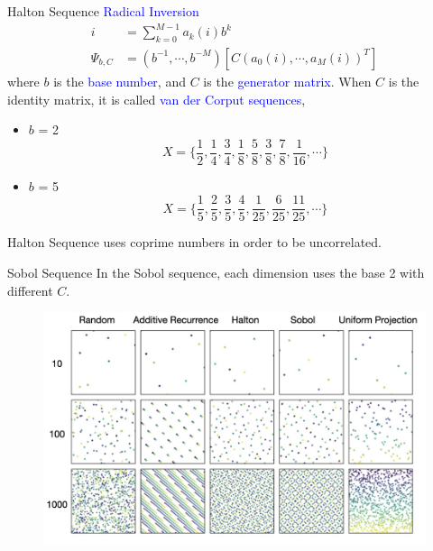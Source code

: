 \documentclass{beamer}
\begin{document}
\begin{frame}{Halton Sequence}
\textcolor{blue}{Radical Inversion}
\begin{equation*}
\begin{split}
    i & = \sum_{k=0}^{M-1} a_k(i)b^k \\
\Psi_{b, C} &= (b^{-1}, \cdots, b^{-M}) [C (a_0(i), \cdots, a_M(i) )^T]   
\end{split}
\end{equation*}
where $b$ is the \textcolor{blue}{base number}, and $C$ is the \textcolor{blue}{generator matrix}. When $C$ is the identity matrix, it is called \textcolor{blue}{van der Corput sequences},
\begin{itemize}
    \item $b$ = 2 
    \begin{equation*}
        X = \bigg\{ \frac{1}{2}, \frac{1}{4}, \frac{3}{4}, \frac{1}{8}, \frac{5}{8}, \frac{3}{8}, \frac{7}{8}, \frac{1}{16}, \cdots \bigg\}
    \end{equation*}
    \item $b$ = 5 
    \begin{equation*}
        X = \bigg\{ \frac{1}{5}, \frac{2}{5}, \frac{3}{5}, \frac{4}{5}, \frac{1}{25}, \frac{6}{25}, \frac{11}{25}, \cdots \bigg\}
    \end{equation*}
\end{itemize}

Halton Sequence uses coprime numbers in order to be uncorrelated. 

\end{frame}

\begin{frame}{Sobol Sequence}
In the Sobol sequence, each dimension uses the base 2 with different $C$.
\begin{figure}
\centering
\includegraphics[width=120mm]{Figs/sample_all.jpeg}
\end{figure} 



\end{frame}
\end{document}
